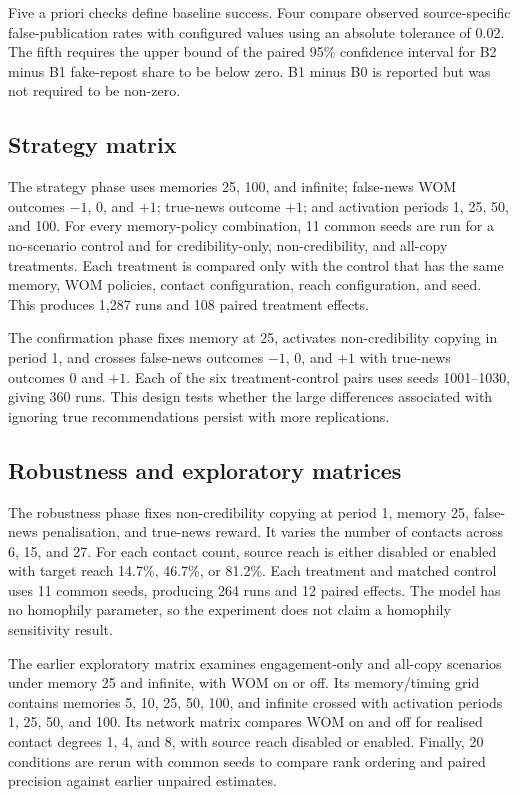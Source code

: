 Five a priori checks define baseline success. Four compare observed source-specific false-publication rates with configured values using an absolute tolerance of 0.02. The fifth requires the upper bound of the paired 95\% confidence interval for B2 minus B1 fake-repost share to be below zero. B1 minus B0 is reported but was not required to be non-zero.

\subsection{Strategy matrix}

The strategy phase uses memories 25, 100, and infinite; false-news WOM outcomes $-1$, $0$, and $+1$; true-news outcome $+1$; and activation periods 1, 25, 50, and 100. For every memory-policy combination, 11 common seeds are run for a no-scenario control and for credibility-only, non-credibility, and all-copy treatments. Each treatment is compared only with the control that has the same memory, WOM policies, contact configuration, reach configuration, and seed. This produces 1,287 runs and 108 paired treatment effects.

The confirmation phase fixes memory at 25, activates non-credibility copying in period 1, and crosses false-news outcomes $-1$, $0$, and $+1$ with true-news outcomes $0$ and $+1$. Each of the six treatment-control pairs uses seeds 1001--1030, giving 360 runs. This design tests whether the large differences associated with ignoring true recommendations persist with more replications.

\subsection{Robustness and exploratory matrices}

The robustness phase fixes non-credibility copying at period 1, memory 25, false-news penalisation, and true-news reward. It varies the number of contacts across 6, 15, and 27. For each contact count, source reach is either disabled or enabled with target reach 14.7\%, 46.7\%, or 81.2\%. Each treatment and matched control uses 11 common seeds, producing 264 runs and 12 paired effects. The model has no homophily parameter, so the experiment does not claim a homophily sensitivity result.

The earlier exploratory matrix examines engagement-only and all-copy scenarios under memory 25 and infinite, with WOM on or off. Its memory/timing grid contains memories 5, 10, 25, 50, 100, and infinite crossed with activation periods 1, 25, 50, and 100. Its network matrix compares WOM on and off for realised contact degrees 1, 4, and 8, with source reach disabled or enabled. Finally, 20 conditions are rerun with common seeds to compare rank ordering and paired precision against earlier unpaired estimates.

